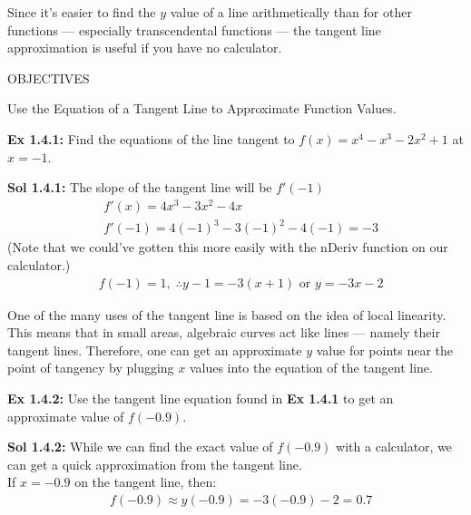 Since it's easier to find the $y$ value of a line arithmetically than for other functions --- especially transcendental functions --- the tangent line approximation is useful if you have no calculator. \par

\begin{tcolorbox}[objective]
    \begin{center}
        OBJECTIVES \\[11pt]
    \end{center}
    Use the Equation of a Tangent Line to Approximate Function Values.
\end{tcolorbox} \vspace{11pt}

\begin{tcolorbox}[example]
    \textbf{Ex 1.4.1: } Find the equations of the line tangent to $f(x) = x^4 - x^3 - 2x^2 + 1$ at $x = -1$. 
\end{tcolorbox}
\begin{tcolorbox}[solution]
    \textbf{Sol 1.4.1: } The slope of the tangent line will be $f'(-1)$ \begin{align*}
        & f'(x) = 4x^3 - 3x^2 - 4x \\[11pt]
        & f'(-1) = 4(-1)^3 - 3(-1)^2 - 4(-1) = -3 
    \end{align*} 
    (Note that we could've gotten this more easily with the nDeriv function on our calculator.) \begin{align*}
        & f(-1) = 1, \; \therefore \boxed{y - 1 = -3(x + 1)} \text{ or } \boxed{y = -3x - 2} 
    \end{align*} 
\end{tcolorbox}

One of the many uses of the tangent line is based on the idea of local linearity. This means that in small areas, algebraic curves act like lines --- namely their tangent lines. Therefore, one can get an approximate $y$ value for points near the point of tangency by plugging $x$ values into the equation of the tangent line. \par

\begin{tcolorbox}[example]
    \textbf{Ex 1.4.2: } Use the tangent line equation found in \textbf{Ex 1.4.1} to get an approximate value of $f(-0.9)$. 
\end{tcolorbox}
\begin{tcolorbox}[solution]
    \textbf{Sol 1.4.2: } While we can find the exact value of $f(-0.9)$ with a calculator, we can get a quick approximation from the tangent line. \\[11pt]
    If $x = -0.9$ on the tangent line, then: \begin{align*}
        & f(-0.9) \approx y(-0.9) = -3(-0.9) - 2 = \boxed{0.7}
    \end{align*}
\end{tcolorbox}

